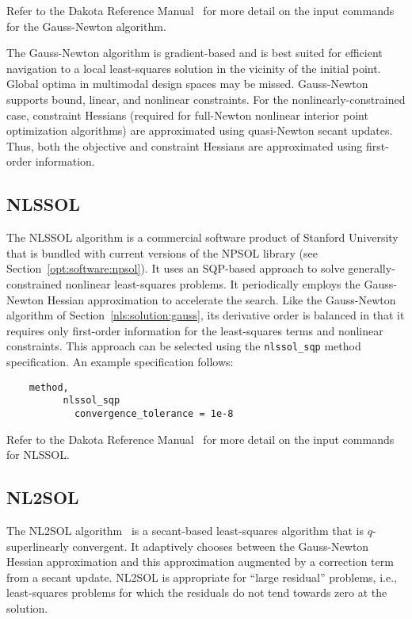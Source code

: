 Refer to the Dakota Reference Manual~\cite{RefMan} for more detail on the
input commands for the Gauss-Newton algorithm.

The Gauss-Newton algorithm is gradient-based and is best suited for
efficient navigation to a local least-squares solution in the vicinity
of the initial point. Global optima in multimodal design spaces may be
missed. Gauss-Newton supports bound, linear, and nonlinear
constraints. For the nonlinearly-constrained case, constraint Hessians
(required for full-Newton nonlinear interior point optimization
algorithms) are approximated using quasi-Newton secant updates.  Thus,
both the objective and constraint Hessians are approximated using
first-order information.

\subsection{NLSSOL}\label{nls:solution:nlssol}

The NLSSOL algorithm is a commercial software product of Stanford
University that is bundled with current versions of the NPSOL library
(see Section~\ref{opt:software:npsol}).  It uses an SQP-based approach
to solve generally-constrained nonlinear least-squares problems. It
periodically employs the Gauss-Newton Hessian approximation to
accelerate the search. Like the Gauss-Newton algorithm of
Section~\ref{nls:solution:gauss}, its derivative order is balanced in
that it requires only first-order information for the least-squares
terms and nonlinear constraints. This approach can be selected using
the \texttt{nlssol\_sqp} method specification. An example
specification follows:
\begin{small}
\begin{verbatim}
    method,
          nlssol_sqp
            convergence_tolerance = 1e-8
\end{verbatim}
\end{small}

Refer to the Dakota Reference Manual~\cite{RefMan} for more detail on the
input commands for NLSSOL.

\subsection{NL2SOL}\label{nls:solution:nl2sol}

The NL2SOL algorithm~\cite{Den81} is a secant-based least-squares
algorithm that is $q$-superlinearly convergent.  It adaptively chooses
between the Gauss-Newton Hessian approximation and this approximation
augmented by a correction term from a secant update.
NL2SOL is appropriate
for ``large residual'' problems, i.e., least-squares problems for
which the residuals do not tend towards zero at the solution.

